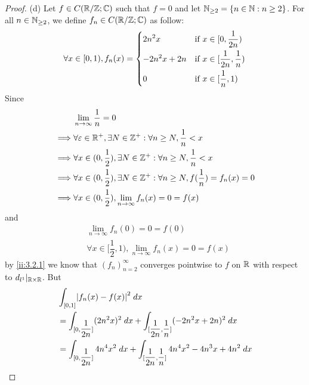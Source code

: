 \begin{proof}{(d)}
  Let \(f \in C(\mathbb{R} / \mathbb{Z} ; \mathbb{C})\) such that \(f = 0\) and let \(\mathbb{N}_{\geq 2} = \left\lbrace n \in \mathbb{N} : n \geq 2\right\rbrace\).
  For all \(n \in \mathbb{N}_{\geq 2}\), we define \(f_n \in C(\mathbb{R} / \mathbb{Z} ; \mathbb{C})\) as follow:
  \[
    \forall x \in [0, 1), f_n(x) = \begin{dcases}
      2 n^2 x       & \text{if } x \in [0, \dfrac{1}{2n})            \\
      -2 n^2 x + 2n & \text{if } x \in [\dfrac{1}{2n}, \dfrac{1}{n}) \\
      0             & \text{if } x \in [\dfrac{1}{n}, 1)
    \end{dcases}
  \]
  Since
  \begin{align*}
             & \lim_{n \to \infty} \dfrac{1}{n} = 0                                                                 \\
    \implies & \forall \varepsilon \in \mathbb{R}^+, \exists N \in \mathbb{Z}^+ : \forall n \geq N, \dfrac{1}{n} < x                \\
    \implies & \forall x \in (0, \dfrac{1}{2}), \exists N \in \mathbb{Z}^+ : \forall n \geq N, \dfrac{1}{n} < x             \\
    \implies & \forall x \in (0, \dfrac{1}{2}), \exists N \in \mathbb{Z}^+ : \forall n \geq N, f(\dfrac{1}{n}) = f_n(x) = 0 \\
    \implies & \forall x \in (0, \dfrac{1}{2}), \lim_{n \to \infty} f_n(x) = 0 = f(x)
  \end{align*}
  and
  \begin{align*}
     & \lim_{n \to \infty} f_n(0) = 0 = f(0)                                  \\
     & \forall x \in [\dfrac{1}{2}, 1), \lim_{n \to \infty} f_n(x) = 0 = f(x)
  \end{align*}
  by \cref{ii:3.2.1} we know that \((f_n)_{n = 2}^\infty\) converges pointwise to \(f\) on \(\mathbb{R}\) with respect to \(d_{l^1}|_{\mathbb{R} \times \mathbb{R}}\).
  But
  \begin{align*}
     & \int_{[0, 1]} \abs{f_n(x) - f(x)}^2 \; dx                                                                                                                    \\
     & = \int_{[0, \dfrac{1}{2n}]} (2 n^2 x)^2 \; dx + \int_{[\dfrac{1}{2n}, \dfrac{1}{n}]} (-2n^2 x + 2n)^2 \; dx                                                  \\
     & = \int_{[0, \dfrac{1}{2n}]} 4 n^4 x^2 \; dx + \int_{[\dfrac{1}{2n}, \dfrac{1}{n}]} 4 n^4 x^2 - 4 n^3 x + 4n^2 \; dx                                          \\

\end{align*}
\end{proof}
